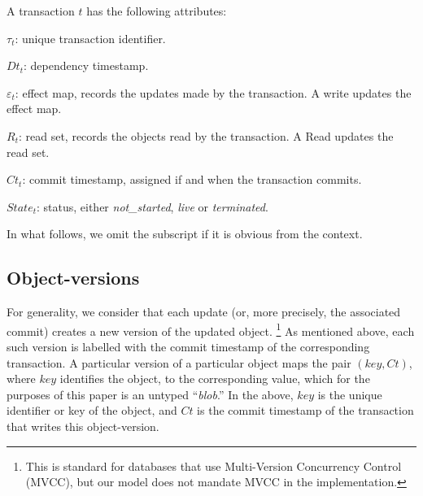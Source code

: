 \documentclass[systeme,french,english]{compas2022}
\begin{document}
A transaction $t$ has the following attributes:
\begin{compactitem}
\item $\tau_{t}$: unique transaction identifier.
\item $\mathit{Dt}_{t}$: dependency timestamp.
\item {$\varepsilon_{t}$}: effect map, records the updates made by the
  transaction.
  A write updates the effect map.
\item ${R}_{t}$: read set, records the objects read by the transaction.
  A Read updates the read set.
\item $\mathit{Ct}_{t}$: commit timestamp, assigned if and when the
  transaction commits.
\item $\mathit{State}_{t}$: status, either \emph{not\_started}, \emph{live} or \emph{terminated}.
\end{compactitem}
In what follows, we omit the subscript if it is obvious from the context.

\subsection{Object-versions}

For generality, we consider that each update (or, more precisely, the
associated commit) creates a new version of the updated object.%
%
\footnote{
%
  This is standard for databases that use Multi-Version Concurrency
  Control (MVCC), but our model does not mandate MVCC in the
  implementation.
}
%
As mentioned above, each such version is labelled with the commit
timestamp of the corresponding transaction.
A particular version of a particular object maps the pair
$(\mathit{key},\mathit{Ct})$, where $\mathit{key}$ identifies the
object, to the corresponding value, which for the purposes of this paper
is an untyped ``\emph{blob}.''
In the above, $\mathit{key}$ is the unique identifier or key of the
object, and $\mathit{Ct}$ is the commit timestamp of the transaction
that writes this object-version.

\end{document}
